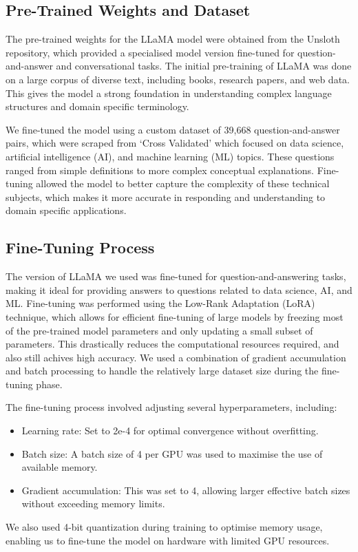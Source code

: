 \documentclass{article}
\begin{document}
\subsection{Pre-Trained Weights and Dataset}

The pre-trained weights for the LLaMA model were obtained from the Unsloth repository, which
provided a specialised model version fine-tuned for question-and-answer and conversational tasks.
The initial pre-training of LLaMA was done on a large corpus of diverse text, including books,
research papers, and web data. This gives the model a strong foundation in understanding complex
language structures and domain specific terminology.

We fine-tuned the model using a custom dataset of 39,668 question-and-answer pairs, which were scraped
from `Cross Validated' which focused on data science, artificial intelligence (AI), and machine learning (ML) topics.
These questions ranged from simple definitions to more complex conceptual explanations. Fine-tuning allowed the
model to better capture the complexity of these technical subjects, which makes it more accurate in responding and
understanding to domain specific applications.

\subsection{Fine-Tuning Process}

The version of LLaMA we used was fine-tuned for question-and-answering tasks, making it ideal for providing answers
to questions related to data science, AI, and ML.
Fine-tuning was performed using the Low-Rank Adaptation (LoRA) technique, which allows for efficient fine-tuning
of large models by freezing most of the pre-trained model parameters and only updating a small subset of parameters.
This drastically reduces the computational resources required, and also still achives high accuracy. We used
a combination of gradient accumulation and batch processing to handle the relatively large dataset size during
the fine-tuning phase.

The fine-tuning process involved adjusting several hyperparameters, including:
\begin{itemize}
    \item Learning rate: Set to 2e-4 for optimal convergence without overfitting.
    \item Batch size: A batch size of 4 per GPU was used to maximise the use of available memory.
    \item Gradient accumulation: This was set to 4, allowing larger effective batch sizes without exceeding memory limits.
\end{itemize}
We also used 4-bit quantization during training to optimise memory usage, enabling us to fine-tune the model on hardware with limited GPU resources.
\end{document}
